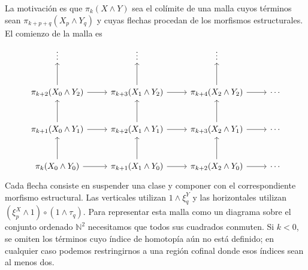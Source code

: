 La motivación es que $\pi_k(X\wedge Y)$ sea el colímite de una malla cuyos términos sean $\pi_{k+p+q}(X_p\wedge Y_q)$ y cuyas flechas procedan de los morfismos estructurales. El comienzo de la malla es
\[
\begin{tikzcd}[row sep=large]
\vdots & \vdots & \vdots\\
\pi_{k+2}(X_0\wedge Y_2) \arrow[u] \arrow[r]
& \pi_{k+3}(X_1\wedge Y_2) \arrow[u] \arrow[r]
& \pi_{k+4}(X_2\wedge Y_2) \arrow[u] \arrow[r] & \cdots\\
\pi_{k+1}(X_0\wedge Y_1) \arrow[u] \arrow[r]
& \pi_{k+2}(X_1\wedge Y_1) \arrow[u] \arrow[r]
& \pi_{k+3}(X_2\wedge Y_1) \arrow[u] \arrow[r] & \cdots\\
\pi_k(X_0\wedge Y_0) \arrow[u] \arrow[r]
& \pi_{k+1}(X_1\wedge Y_0) \arrow[u] \arrow[r]
& \pi_{k+2}(X_2\wedge Y_0) \arrow[u] \arrow[r] & \cdots
\end{tikzcd}
\]
Cada flecha consiste en suspender una clase y componer con el correspondiente morfismo estructural. Las verticales utilizan $1\wedge\xi^Y_q$ y las horizontales utilizan $(\xi^X_p\wedge1)\circ(1\wedge\tau_q)$. Para representar esta malla como un diagrama sobre el conjunto ordenado $\mathbb N^2$ necesitamos que todos sus cuadrados conmuten. Si $k<0$, se omiten los términos cuyo índice de homotopía aún no está definido; en cualquier caso podemos restringirnos a una región cofinal donde esos índices sean al menos dos.

